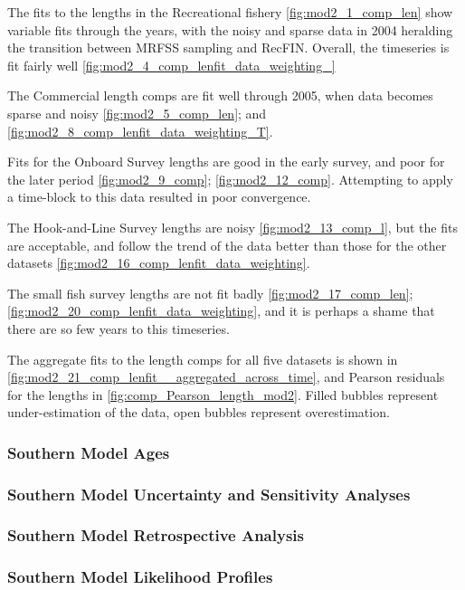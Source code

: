 \documentclass[12pt,]{article}
\begin{document}
The fits to the lengths in the Recreational fishery
\ref{fig:mod2_1_comp_len} show variable fits through the years, with the
noisy and sparse data in 2004 heralding the transition between MRFSS
sampling and RecFIN. Overall, the timeseries is fit fairly well
\ref{fig:mod2_4_comp_lenfit_data_weighting_}

The Commercial length comps are fit well through 2005, when data becomes
sparse and noisy \ref{fig:mod2_5_comp_len}; and
\ref{fig:mod2_8_comp_lenfit_data_weighting_T}.

Fits for the Onboard Survey lengths are good in the early survey, and
poor for the later period \ref{fig:mod2_9_comp}; \ref{fig:mod2_12_comp}.
Attempting to apply a time-block to this data resulted in poor
convergence.

The Hook-and-Line Survey lengths are noisy \ref{fig:mod2_13_comp_l}, but
the fits are acceptable, and follow the trend of the data better than
those for the other datasets
\ref{fig:mod2_16_comp_lenfit_data_weighting}.

The small fish survey lengths are not fit badly
\ref{fig:mod2_17_comp_len};
\ref{fig:mod2_20_comp_lenfit_data_weighting}, and it is perhaps a shame
that there are so few years to this timeseries.

The aggregate fits to the length comps for all five datasets is shown in
\ref{fig:mod2_21_comp_lenfit__aggregated_across_time}, and Pearson
residuals for the lengths in \ref{fig:comp_Pearson_length_mod2}. Filled
bubbles represent under-estimation of the data, open bubbles represent
overestimation.

\subsubsection{Southern Model Ages}\label{southern-model-ages}

\subsubsection{Southern Model Uncertainty and Sensitivity
Analyses}\label{southern-model-uncertainty-and-sensitivity-analyses}

\subsubsection{Southern Model Retrospective
Analysis}\label{southern-model-retrospective-analysis}

\subsubsection{Southern Model Likelihood
Profiles}\label{southern-model-likelihood-profiles}
\end{document}
